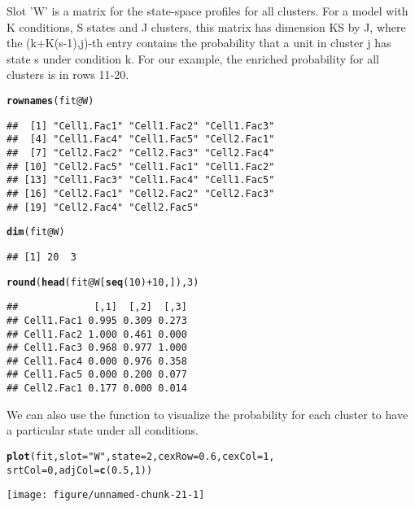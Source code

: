 \documentclass[a4paper,10pt]{article}\usepackage[]{graphicx}\usepackage[]{color}
\makeatletter
\def\maxwidth{ %
  \ifdim\Gin@nat@width>\linewidth
    \linewidth
  \else
    \Gin@nat@width
  \fi
}
\newcommand{\hlnum}[1]{\textcolor[rgb]{0.686,0.059,0.569}{#1}}%
\newcommand{\hlstr}[1]{\textcolor[rgb]{0.192,0.494,0.8}{#1}}%
\newcommand{\hlopt}[1]{\textcolor[rgb]{0,0,0}{#1}}%
\newcommand{\hlstd}[1]{\textcolor[rgb]{0.345,0.345,0.345}{#1}}%
\newcommand{\hlkwc}[1]{\textcolor[rgb]{0.333,0.667,0.333}{#1}}%
\newcommand{\hlkwd}[1]{\textcolor[rgb]{0.737,0.353,0.396}{\textbf{#1}}}%
\newenvironment{kframe}{%
 \def\at@end@of@kframe{}%
 \ifinner\ifhmode%
  \def\at@end@of@kframe{\end{minipage}}%
  \begin{minipage}{\columnwidth}%
 \fi\fi%
 \def\FrameCommand##1{\hskip\@totalleftmargin \hskip-\fboxsep
 \colorbox{shadecolor}{##1}\hskip-\fboxsep
     \hskip-\linewidth \hskip-\@totalleftmargin \hskip\columnwidth}%
 \MakeFramed {\advance\hsize-\width
   \@totalleftmargin\z@ \linewidth\hsize
   \@setminipage}}%
 {\par\unskip\endMakeFramed%
 \at@end@of@kframe}
\newenvironment{knitrout}{}{} %
\makeatother
\begin{document}
Slot 'W' is a matrix for the state-space profiles for all clusters. For a model with K conditions, S states and J clusters, this matrix has dimension KS by J, where the (k+K(s-1),j)-th entry contains the probability that a unit in cluster j has state s under condition k. For our example, the enriched probability for all clusters is in rows 11-20.

\begin{knitrout}
\color{fgcolor}\begin{kframe}
\begin{alltt}
\hlkwd{rownames}\hlstd{(fit}\hlopt{@}\hlkwc{W}\hlstd{)}
\end{alltt}
\begin{verbatim}
##  [1] "Cell1.Fac1" "Cell1.Fac2" "Cell1.Fac3"
##  [4] "Cell1.Fac4" "Cell1.Fac5" "Cell2.Fac1"
##  [7] "Cell2.Fac2" "Cell2.Fac3" "Cell2.Fac4"
## [10] "Cell2.Fac5" "Cell1.Fac1" "Cell1.Fac2"
## [13] "Cell1.Fac3" "Cell1.Fac4" "Cell1.Fac5"
## [16] "Cell2.Fac1" "Cell2.Fac2" "Cell2.Fac3"
## [19] "Cell2.Fac4" "Cell2.Fac5"
\end{verbatim}
\begin{alltt}
\hlkwd{dim}\hlstd{(fit}\hlopt{@}\hlkwc{W}\hlstd{)}
\end{alltt}
\begin{verbatim}
## [1] 20  3
\end{verbatim}
\begin{alltt}
\hlkwd{round}\hlstd{(}\hlkwd{head}\hlstd{(fit}\hlopt{@}\hlkwc{W}\hlstd{[}\hlkwd{seq}\hlstd{(}\hlnum{10}\hlstd{)} \hlopt{+} \hlnum{10}\hlstd{, ]),} \hlnum{3}\hlstd{)}
\end{alltt}
\begin{verbatim}
##             [,1]  [,2]  [,3]
## Cell1.Fac1 0.995 0.309 0.273
## Cell1.Fac2 1.000 0.461 0.000
## Cell1.Fac3 0.968 0.977 1.000
## Cell1.Fac4 0.000 0.976 0.358
## Cell1.Fac5 0.000 0.200 0.077
## Cell2.Fac1 0.177 0.000 0.014
\end{verbatim}
\end{kframe}
\end{knitrout}

We can also use the  function to visualize the probability for each cluster to have a particular state under all conditions.

\begin{knitrout}
\color{fgcolor}\begin{kframe}
\begin{alltt}
\hlkwd{plot}\hlstd{(fit,} \hlkwc{slot} \hlstd{=} \hlstr{"W"}\hlstd{,} \hlkwc{state} \hlstd{=} \hlnum{2}\hlstd{,} \hlkwc{cexRow} \hlstd{=} \hlnum{0.6}\hlstd{,} \hlkwc{cexCol} \hlstd{=} \hlnum{1}\hlstd{,}
    \hlkwc{srtCol} \hlstd{=} \hlnum{0}\hlstd{,} \hlkwc{adjCol} \hlstd{=} \hlkwd{c}\hlstd{(}\hlnum{0.5}\hlstd{,} \hlnum{1}\hlstd{))}
\end{alltt}
\end{kframe}

{\centering \texttt{[image: figure/unnamed-chunk-21-1]} 

}



\end{knitrout}
\end{document}
